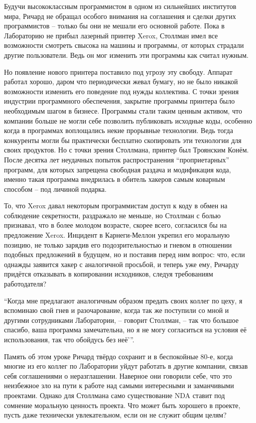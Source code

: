 Будучи высококлассным программистом в одном из сильнейших институтов мира, Ричард не обращал особого внимания на соглашения и сделки других программистов -- только бы они не мешали его основной работе. Пока в Лабораторию не прибыл лазерный принтер Xerox, Столлман имел все возможности смотреть свысока на машины и программы, от которых страдали другие пользователи. Ведь он мог изменить эти программы как считал нужным.

Но появление нового принтера поставило под угрозу эту свободу. Аппарат работал хорошо, даром что периодически жевал бумагу, но не было никакой возможности изменить его поведение под нужды коллектива. С точки зрения индустрии программного обеспечения, закрытие программы принтера было необходимым шагом в бизнесе. Программы стали таким ценным активом, что компании больше не могли себе позволить публиковать исходные коды, особенно когда в программах воплощались некие прорывные технологии. Ведь тогда конкуренты могли бы практически бесплатно скопировать эти технологии для своих продуктов. Но с точки зрения Столлмана, принтер был Троянским Конём. После десятка лет неудачных попыток распространения \enquote{проприетарных} программ, для которых запрещена свободная раздача и модификация кода, именно такая программа внедрилась в обитель хакеров самым коварным способом -- под личиной подарка.

То, что Xerox давал некоторым программистам доступ к коду в обмен на соблюдение секретности, раздражало не меньше, но Столлман с болью признавал, что в более молодом возрасте, скорее всего, согласился бы на предложение Xerox. Инцидент в Карнеги-Меллон укрепил его моральную позицию, не только зарядив его подозрительностью и гневом в отношении подобных предложений в будущем, но и поставив перед ним вопрос: что, если однажды заявится хакер с аналогичной просьбой, и теперь уже ему, Ричарду придётся отказывать в копировании исходников, следуя требованиям работодателя?

\enquote{Когда мне предлагают аналогичным образом предать своих коллег по цеху, я вспоминаю свой гнев и разочарование, когда так же поступили со мной и другими сотрудниками Лаборатории, -- говорит Столлман, -- так что большое спасибо, ваша программа замечательна, но я не могу согласиться на условия её использования, так что обойдусь без неё'\hspace{0.01in}}.

Память об этом уроке Ричард твёрдо сохранит и в беспокойные 80-е, когда многие из его коллег по Лаборатории уйдут работать в другие компании, связав себя соглашениями о неразглашении. Наверное они говорили себе, что это неизбежное зло на пути к работе над самыми интересными и заманчивыми проектами. Однако для Столлмана само существование NDA ставит под сомнение моральную ценность проекта. Что может быть хорошего в проекте, пусть даже технически увлекательном, если он не служит общим целям?

